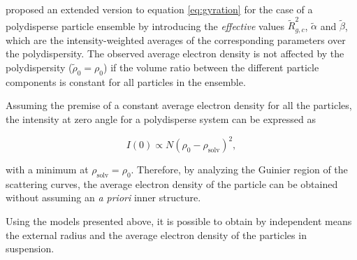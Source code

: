 \cite{avdeev_contrast_2007} proposed an extended version to equation \eqref{eq:gyration} for the case of a polydisperse particle ensemble by introducing the \emph{effective} values \( \tilde R^2_{g,c} \), \( \tilde \alpha \) and \( \tilde \beta \), which are the intensity-weighted averages of the corresponding parameters over the polydispersity. The observed average electron density is not affected by the polydispersity (\( \tilde\rho_0=\rho_0 \)) if the volume ratio between the different particle components is constant for all particles in the ensemble.

Assuming the premise of a constant average electron density for all the particles, the intensity at zero angle for a polydisperse system can be expressed as

\begin{equation}
\label{eq:I0}
I(0)\propto N \left( \rho_0-\rho_{\text{solv}} \right)^2 ,
\end{equation}

with a minimum at \( \rho_{\text{solv}}=\rho_0 \). Therefore, by analyzing the Guinier region of the scattering curves, the average electron density of the particle can be obtained without assuming an \emph{a priori} inner structure.

Using the models presented above, it is possible to obtain by independent means the external radius and the average electron density of the particles in suspension.
